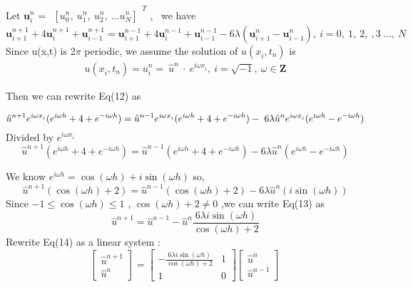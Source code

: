 \documentclass{report}
\begin{document}
\newpage
Let $\textbf{u}^{n}_{i}$
=
$\begin{matrix}
\left[
u^{n}_{0},\ 
u^{n}_{1},\ 
u^{n}_{2},\ 
\dots
u^{n}_{N}
\right]
\end{matrix}^T$ , \ we have
\begin{equation}
\textbf{u}^{n+1}_{i+1}+ 4\textbf{u}^{n+1}_{i}+\textbf{u}^{n+1}_{i-1}
=
\textbf{u}^{n-1}_{i+1}+ 4\textbf{u}^{n-1}_{i}+\textbf{u}^{n-1}_{i-1}
-6\lambda
(\textbf{u}^{n}_{i+1}-\textbf{u}^{n}_{i-1})
, \ i =0,\ 1,\ 2,\ ,3\ \dots, \ N
\end{equation}    
Since u(x,t) is 2$\pi$ periodic, we assume the solution of $u(x^{}_{i},t^{}_{n})$ is 
\begin{align*}
u(x^{}_{i},t^{}_{n}) =u^{n}_{i} =\ \hat{u}^n\ \cdot \ e^{i \omega x^{}_{i}},\ i = \sqrt{-1},\ \omega \in \textbf{Z} 
\end{align*}

Then we can rewrite Eq(12) as

\begin{displaymath}
\hat{u}^{n+1}e^{i \omega x^{}_{i}}(e^{i \omega h}+4+e^{-i \omega h}) =
\hat{u}^{n-1}e^{i \omega x^{}_{i}}(e^{i \omega h}+4+e^{-i \omega h})-\ 6\lambda\hat{u}^{n}e^{i \omega x^{}_{i}}(e^{i \omega h}-  e^{-i \omega h}) \\
\end{displaymath}
Divided by $e^{i \omega x^{}_{i}}$ 
\begin{displaymath}
\hat{u}^{n+1} (e^{i \omega h}+4+e^{-i \omega h})=  \hat{u}^{n-1}(e^{i \omega h}+4+e^{-i \omega h}) - 6\lambda\hat{u}^{n}(e^{i \omega h}-  e^{-i \omega h})
\end{displaymath}












We know $e^{i \omega h} = \cos(\omega h) + i \sin(\omega h)$ so, 
\begin{equation}
\hat{u}^{n+1} (\cos(\omega h) + 2)=  \hat{u}^{n-1}(\cos(\omega h) + 2) - 6\lambda\hat{u}^{n}(i \sin(\omega h))
\end{equation}
Since  $-1 \le \cos(\omega h) \le 1$ , $\cos(\omega h) + 2 \neq 0$ ,we can write Eq(13) as
\begin{equation}
\hat{u}^{n+1} =  \hat{u}^{n-1} - \hat{u}^{n}
\frac{6\lambda i \sin (\omega h)}{\cos(\omega h) + 2}
\end{equation}
Rewrite Eq(14) as a linear system :
\begin{equation}
\left[
\begin{matrix}
\hat{u}^{n+1} 
\\
\hat{u}^{n} 
\end{matrix}
\right]
=
\left[
\begin{matrix}
 -\frac{6\lambda i \sin (\omega h)}{\cos(\omega h) + 2}& 1
\\
1  & 0
\end{matrix}
\right]
%
\left[
\begin{matrix}
\hat{u}^{n} 
\\
\hat{u}^{n-1} 
\end{matrix}
\right]
\end{equation}
\end{document}
